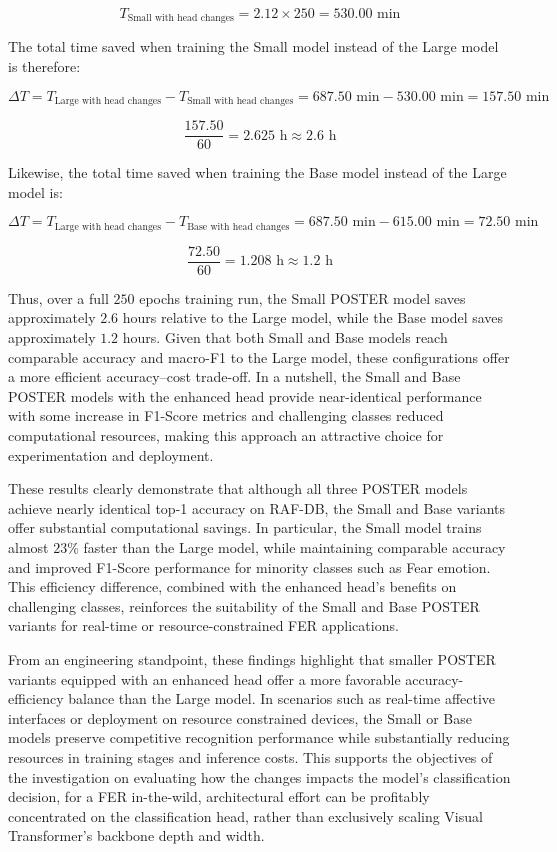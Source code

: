$$
T_{\text{Small with head changes}} = 2.12 \times 250 = 530.00 \text{ min}
$$

The total time saved when training the Small model instead of the Large model is therefore:

$$
\Delta T = T_{\text{Large with head changes}}- T_{\text{Small with head changes}}= 687.50 \text{ min} - 530.00 \text{ min} = 157.50 \text{ min}
$$

$$
\frac{157.50}{60} = 2.625 \text{ h} \approx 2.6 \text{ h}
$$

Likewise, the total time saved when training the Base model instead of the Large model is:

$$
\Delta T = T_{\text{Large with head changes}}- T_{\text{Base with head changes}} = 687.50 \text{ min} - 615.00 \text{ min} = 72.50 \text{ min}
$$

$$
\frac{72.50}{60} = 1.208 \text{ h} \approx 1.2 \text{ h}
$$

Thus, over a full $250$ epochs training run, the Small POSTER model saves approximately $2.6$ hours relative to the Large model, while the Base model saves approximately $1.2$ hours. Given that both Small and Base models reach comparable accuracy and macro-F1 to the Large model, these configurations offer a more efficient accuracy--cost trade-off. In a nutshell, the Small and Base POSTER models with the enhanced head provide near-identical performance with some increase in F1-Score metrics and challenging classes reduced computational resources, making this approach an attractive choice for experimentation and deployment.


These results clearly demonstrate that although all three POSTER models achieve nearly identical top-1 accuracy on RAF-DB, the Small and Base variants offer substantial computational savings. In particular, the Small model trains almost $23\%$ faster than the Large model, while maintaining comparable accuracy and improved F1-Score performance for minority classes such as Fear emotion. This efficiency difference, combined with the enhanced head’s benefits on challenging classes, reinforces the suitability of the Small and Base POSTER variants for real-time or resource-constrained FER applications.

From an engineering standpoint, these findings highlight that smaller POSTER variants equipped with an enhanced head offer a more favorable accuracy-efficiency balance than the Large model. In scenarios such as real-time affective interfaces or deployment on resource constrained devices, the Small or Base models preserve competitive recognition performance while substantially reducing resources in training stages and inference costs. This supports the objectives of the investigation on evaluating how the changes impacts the model's classification decision, for a \gls{FER} \gls{in-the-wild}, architectural effort can be profitably concentrated on the classification head, rather than exclusively scaling Visual Transformer's backbone depth and width.
 
